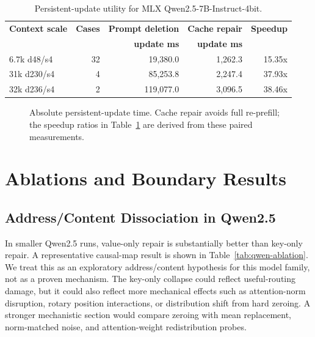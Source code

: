 \documentclass[11pt]{article}
\newcommand{\qwen}{Qwen2.5-7B-Instruct-4bit}
\begin{document}
\begin{table}[H]
\centering
\small
\begin{tabular}{lrrrr}
\toprule
\textbf{Context scale} & \textbf{Cases} & \textbf{Prompt deletion} & \textbf{Cache repair} & \textbf{Speedup} \\
 & & \textbf{update ms} & \textbf{update ms} & \\
\midrule
6.7k d48/s4 & 32 & 19,380.0 & 1,262.3 & 15.35x \\
31k d230/s4 & 4 & 85,253.8 & 2,247.4 & 37.93x \\
32k d236/s4 & 2 & 119,077.0 & 3,096.5 & 38.46x \\
\bottomrule
\end{tabular}
\caption{Persistent-update utility for MLX \qwen{}.}
\label{tab:runtime}
\end{table}

\begin{figure}[H]
\centering
{}
\caption{Absolute persistent-update time. Cache repair avoids full re-prefill;
the speedup ratios in Table~\ref{tab:runtime} are derived from these paired
measurements.}
\label{fig:runtime}
\end{figure}

\section{Ablations and Boundary Results}

\subsection{Address/Content Dissociation in Qwen2.5}

In smaller Qwen2.5 runs, value-only repair is substantially better than
key-only repair. A representative causal-map result is shown in
Table~\ref{tab:qwen-ablation}. We treat this as an exploratory
address/content hypothesis for this model family, not as a proven mechanism.
The key-only collapse could reflect useful-routing damage, but it could also
reflect more mechanical effects such as attention-norm disruption, rotary
position interactions, or distribution shift from hard zeroing. A stronger
mechanistic section would compare zeroing with mean replacement, norm-matched
noise, and attention-weight redistribution probes.
\end{document}
